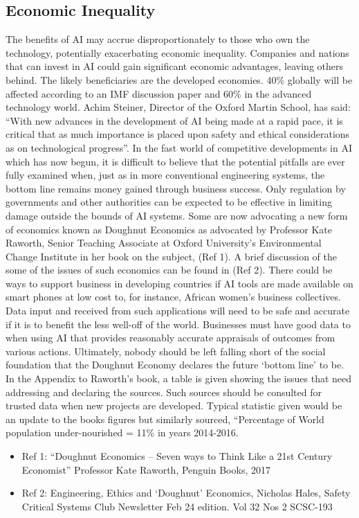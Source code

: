 \subsection{Economic Inequality}
The benefits of AI may accrue disproportionately to those who own the technology, potentially exacerbating economic inequality. Companies and nations that can invest in AI could gain significant economic advantages, leaving others behind. The likely beneficiaries are the developed economies. 40\% globally will be affected according to an IMF discussion paper and 60\% in the advanced technology world. Achim Steiner, Director of the Oxford Martin School, has said: “With new advances in the development of AI being made at a rapid pace, it is critical that as much importance is placed upon safety and ethical considerations as on technological progress”. In the fast world of competitive developments in AI which has now begun,  it is difficult to believe that the potential pitfalls are ever fully examined when, just as in more conventional engineering systems, the bottom line remains money gained through business success. Only regulation by governments and other authorities can be expected to be effective in limiting damage outside the bounds of AI systems. Some are now advocating a new form of economics known as Doughnut Economics as advocated by Professor Kate Raworth, Senior Teaching Associate at Oxford University’s Environmental Change Institute in her book on the subject, (Ref 1). A brief discussion of the some of the issues of such economics can be found in (Ref 2). There could be ways to support business in developing countries if AI tools are made available on smart phones at low cost to, for instance, African women’s business collectives. Data input and received from such applications will need to be safe and accurate if it is to benefit the less well-off of the world. Businesses must have good data to when using AI that provides reasonably accurate appraisals of outcomes from various actions. Ultimately, nobody should be left falling short of the social foundation that the Doughnut Economy declares the future ‘bottom line’ to be. In the Appendix to Raworth’s book, a table is given showing the issues that need addressing and declaring the sources. Such sources should be consulted for trusted data when new projects are developed. Typical statistic given would be an update to the books figures but similarly sourced, “Percentage of World population under-nourished = 11\% in years 2014-2016. 
\begin{itemize}
\item Ref 1: “Doughnut Economics – Seven ways to Think Like a 21st Century Economist” Professor Kate Raworth, Penguin Books, 2017 
\item Ref 2: Engineering, Ethics and ‘Doughnut’ Economics, Nicholas Hales,  Safety Critical Systems Club Newsletter Feb 24 edition. Vol 32 Nos 2 SCSC-193
\end{itemize}

